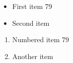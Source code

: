 \documentclass{article}
\begin{document}
\begin{itemize}
\item First item 79
\item Second item
\end{itemize}
\begin{enumerate}
\item Numbered item 79
\item Another item
\end{enumerate}
\end{document}

